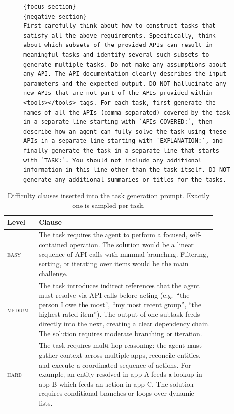 \begin{figure}[t]
\begin{lstlisting}[style=prettyprompt, captionpos=b, caption={Task generation prompt.}, label={lst:taskgen_prompt}]
{focus_section}
{negative_section}
First carefully think about how to construct tasks that satisfy all the above requirements. Specifically, think about which subsets of the provided APIs can result in meaningful tasks and identify several such subsets to generate multiple tasks. Do not make any assumptions about any API. The API documentation clearly describes the input parameters and the expected output. DO NOT hallucinate any new APIs that are not part of the APIs provided within <tools></tools> tags. For each task, first generate the names of all the APIs (comma separated) covered by the task in a separate line starting with `APIs COVERED:`, then describe how an agent can fully solve the task using these APIs in a separate line starting with `EXPLANATION:`, and finally generate the task in a separate line that starts with `TASK:`. You should not include any additional information in this line other than the task itself. DO NOT generate any additional summaries or titles for the tasks.
\end{lstlisting}
\end{figure}


\begin{table}[t]
\centering
\small
\renewcommand{\arraystretch}{1.3}
\begin{tabular}{l p{0.85\linewidth}}
\toprule
\textbf{Level} & \textbf{Clause} \\
\midrule
\textsc{easy}   & The task requires the agent to perform a focused, self-contained operation. The solution would be a linear sequence of API calls with minimal branching. Filtering, sorting, or iterating over items would be the main challenge. \\
\midrule
\textsc{medium} & The task introduces indirect references that the agent must resolve via API calls before acting (e.g.\ ``the person I owe the most'', ``my most recent group'', ``the highest-rated item''). The output of one subtask feeds directly into the next, creating a clear dependency chain. The solution requires moderate branching or iteration. \\
\midrule
\textsc{hard}   & The task requires multi-hop reasoning: the agent must gather context across multiple apps, reconcile entities, and execute a coordinated sequence of actions. For example, an entity resolved in app A feeds a lookup in app B which feeds an action in app C. The solution requires conditional branches or loops over dynamic lists. \\
\bottomrule
\end{tabular}
\caption{Difficulty clauses inserted into the task generation prompt. Exactly one is sampled per task.}
\label{tab:taskgen_difficulty}
\end{table}


